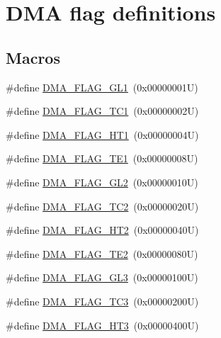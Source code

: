 \hypertarget{group___d_m_a__flag__definitions}{}\section{D\+MA flag definitions}
\label{group___d_m_a__flag__definitions}
\subsection*{Macros}
\begin{DoxyCompactItemize}
\item 
\#define \hyperlink{group___d_m_a__flag__definitions_ga56f71da03db3e0a5dfad8cdfe46eac5c}{D\+M\+A\+\_\+\+F\+L\+A\+G\+\_\+\+G\+L1}~(0x00000001\+U)
\item 
\#define \hyperlink{group___d_m_a__flag__definitions_ga02b6c752c28b35dba79fa1d2bb55ec06}{D\+M\+A\+\_\+\+F\+L\+A\+G\+\_\+\+T\+C1}~(0x00000002\+U)
\item 
\#define \hyperlink{group___d_m_a__flag__definitions_ga4317f6260e1aecc4f5fe882fc043f606}{D\+M\+A\+\_\+\+F\+L\+A\+G\+\_\+\+H\+T1}~(0x00000004\+U)
\item 
\#define \hyperlink{group___d_m_a__flag__definitions_ga198c0b4984a79514964d3dd5ae546008}{D\+M\+A\+\_\+\+F\+L\+A\+G\+\_\+\+T\+E1}~(0x00000008\+U)
\item 
\#define \hyperlink{group___d_m_a__flag__definitions_ga1c8da546d95df14be19e9b82d0a49ecc}{D\+M\+A\+\_\+\+F\+L\+A\+G\+\_\+\+G\+L2}~(0x00000010\+U)
\item 
\#define \hyperlink{group___d_m_a__flag__definitions_gacdf2954f3faf8314811ed39272825ab0}{D\+M\+A\+\_\+\+F\+L\+A\+G\+\_\+\+T\+C2}~(0x00000020\+U)
\item 
\#define \hyperlink{group___d_m_a__flag__definitions_gab21f437ec8a55a600e5ca2af9416baba}{D\+M\+A\+\_\+\+F\+L\+A\+G\+\_\+\+H\+T2}~(0x00000040\+U)
\item 
\#define \hyperlink{group___d_m_a__flag__definitions_ga6d81cc881182d35ba7a34c2759cd97f3}{D\+M\+A\+\_\+\+F\+L\+A\+G\+\_\+\+T\+E2}~(0x00000080\+U)
\item 
\#define \hyperlink{group___d_m_a__flag__definitions_ga245f18e8c146baf3596e7340f7ecae3b}{D\+M\+A\+\_\+\+F\+L\+A\+G\+\_\+\+G\+L3}~(0x00000100\+U)
\item 
\#define \hyperlink{group___d_m_a__flag__definitions_ga17463fb2609ad37aebe6955a044e83c7}{D\+M\+A\+\_\+\+F\+L\+A\+G\+\_\+\+T\+C3}~(0x00000200\+U)
\item 
\#define \hyperlink{group___d_m_a__flag__definitions_gad28ea63fda2c87dd5e2ec08e0ab407d4}{D\+M\+A\+\_\+\+F\+L\+A\+G\+\_\+\+H\+T3}~(0x00000400\+U)

\end{DoxyCompactItemize}
